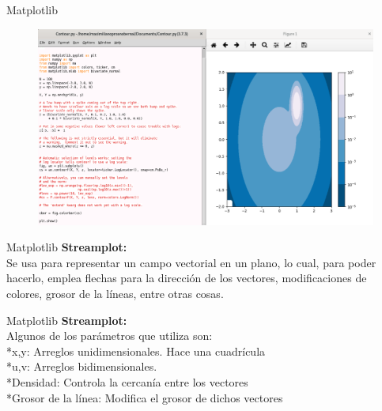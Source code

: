 \documentclass{beamer}
\begin{document}
\begin{frame}{Matplotlib}
	\begin{figure}
		\centering
		\includegraphics[width=1.0\linewidth]{"../Python/Captura Contour"}
		\caption{}
		\label{fig:captura-contour}
	\end{figure}
	
\end{frame}

\begin{frame}{Matplotlib}
	\textbf{Streamplot:}\\ Se usa para representar un campo vectorial en un plano, lo cual, para poder hacerlo, emplea flechas para la dirección de los vectores, modificaciones de colores, grosor de la líneas, entre otras cosas.
\end{frame}

\begin{frame}{Matplotlib}
	\textbf{Streamplot:}\\ Algunos de los parámetros que utiliza son:\\
	*x,y: Arreglos unidimensionales. Hace una cuadrícula\\
	*u,v: Arreglos bidimensionales. \\
	*Densidad: Controla la cercanía entre los vectores\\
	*Grosor de la línea: Modifica el grosor de dichos vectores\\
\end{frame}
\end{document}
